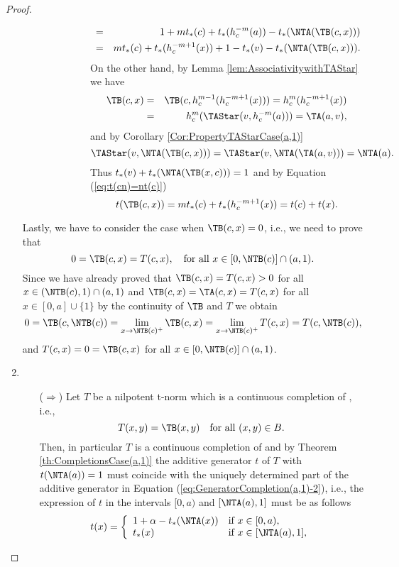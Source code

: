 \begin{proof}
\begin{enumerate}[label=(\roman*)]
\begin{itemize}
\begin{itemize}
\begin{itemize}
\begin{itemize}
\begin{eqnarray*}
							& = & 1 + mt_*(c)+t_*(h_c^{-m}(a)) - t_*(\NTA(\TB(c,x))) \\
							&=& mt_*(c) + t_*(h_c^{-m+1}(x)) + 1 - t_*(v) - t_*(\NTA(\TB(c,x))).
						\end{eqnarray*}
						On the other hand, by Lemma \ref{lem:AssociativitywithTAStar} we have
						\begin{eqnarray*}
						\TB(c,x) & = & \TB(c, h_c^{m-1}(h_c^{-m+1}(x))) = h_c^m(h_c^{-m+1}(x)) \\
						& = & h_c^m(\TAStar(v,h_c^{-m}(a))) = \TA(a,v),
						\end{eqnarray*}
						and by Corollary \ref{Cor:PropertyTAStarCase(a,1)}
						$$\TAStar(v,\NTA(\TB(c,x))) = \TAStar(v,\NTA(\TA(a,v))) = \NTA(a).$$
						Thus $t_*(v) + t_*(\NTA(\TB(x,c))) = 1$ and by Equation (\ref{eq:t(cn)=nt(c)})
						$$t(\TB(c,x)) = mt_*(c) + t_*(h_c^{-m+1}(x)) = t(c) +t(x).$$
					\end{itemize}
				\end{itemize}
			\end{itemize}
		\end{itemize}
		Lastly, we have to consider the case when $\TB(c,x)=0$, i.e., we need to prove that
		$$0=\TB(c,x)=T(c,x), \quad \text{for all } x \in [0,\NTB(c)] \cap (a,1).$$
		Since we have already proved that $\TB(c,x)=T(c,x)>0$ for all $x \in (\NTB(c),1) \cap (a,1)$ and $\TB(c,x)=\TA(c,x)=T(c,x)$ for all $x \in [0,a] \cup \{1\}$  by the continuity of $\TB$ and $T$ we obtain
		$$0 = \TB(c,\NTB(c)) = \lim_{x \to \NTB(c)^{+}} \TB(c,x) = \lim_{x \to \NTB(c)^{+}} T(c,x) = T(c,\NTB(c)),$$
		and $T(c,x)=0=\TB(c,x)$ for all $x \in [0,\NTB(c)] \cap (a,1)$.
		\item ~~
		\begin{itemize}
			\item[($\Rightarrow$)]  Let $T$ be a nilpotent t-norm which is a continuous completion of \TB, i.e.,
			$$T(x,y)=\TB(x,y) \quad \text{for all } (x,y) \in B.$$
			Then, in particular $T$ is a continuous completion of \TA and by Theorem \ref{th:CompletionsCase(a,1)} the additive generator $t$ of $T$ with $t(\NTA(a))=1$ must coincide with the uniquely determined part of the additive generator in Equation (\ref{eq:GeneratorCompletion(a,1)-2}), i.e., the expression of $t$ in the intervals $[0,a)$ and $[\NTA(a),1]$ must be as follows
			$$
			t(x)
			=
			\left\{ \begin{array}{ll}
				1+\alpha-t_{*}(\NTA(x)) & \text{if } x \in [0,a), \\
				t_{*}(x) & \text{if } x \in [\NTA(a),1],
			\end{array} \right.
$$
\end{itemize}
\end{enumerate}
\end{proof}
